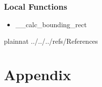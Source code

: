 \documentclass[12pt, titlepage]{article}
\begin{document}
\subsubsection{Local Functions}
\begin{itemize}
\item \_\_calc\_bounding\_rect\\
\end{itemize}


\newpage

 {plainnat}
 {../../../refs/References}

\newpage

\section{Appendix} \label{Appendix}

\end{document}
